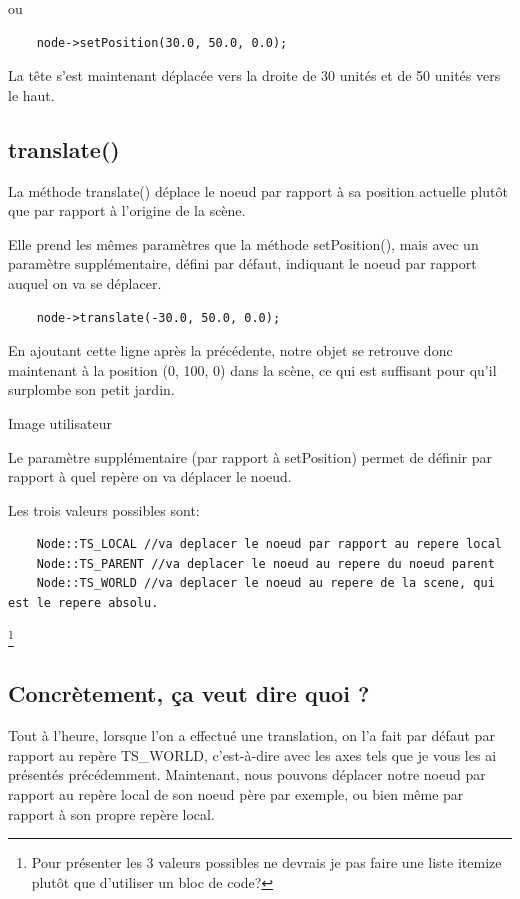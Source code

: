 ou
\begin{lstlisting}
	node->setPosition(30.0, 50.0, 0.0);
\end{lstlisting}

La tête s'est maintenant déplacée vers la droite de 30 unités et de 50 unités vers le haut.




\subsection{translate()}

La méthode translate() déplace le noeud par rapport à sa position actuelle plutôt que par rapport à l'origine de la scène.

Elle prend les mêmes paramètres que la méthode setPosition(), mais avec un paramètre supplémentaire, défini par défaut, indiquant le noeud par rapport auquel on va se déplacer.
\begin{lstlisting}
	node->translate(-30.0, 50.0, 0.0);
\end{lstlisting}

En ajoutant cette ligne après la précédente, notre objet se retrouve donc maintenant à la position (0, 100, 0) dans la scène, ce qui est suffisant pour qu'il surplombe son petit jardin.

Image utilisateur

Le paramètre supplémentaire (par rapport à setPosition) permet de définir par rapport à quel repère on va déplacer le noeud.

Les trois valeurs possibles sont:
\begin{lstlisting}
    Node::TS_LOCAL //va deplacer le noeud par rapport au repere local
    Node::TS_PARENT //va deplacer le noeud au repere du noeud parent
    Node::TS_WORLD //va deplacer le noeud au repere de la scene, qui est le repere absolu.
\end{lstlisting}\footnote{Pour présenter les 3 valeurs possibles ne devrais je pas faire une liste itemize plutôt que d'utiliser un bloc de code?}



\subsection{Concrètement, \c{c}a veut dire quoi ?}

Tout à l'heure, lorsque l'on a effectué une translation, on l'a fait par défaut par rapport au repère TS\_WORLD, c'est-à-dire avec les axes tels que je vous les ai présentés précédemment. Maintenant, nous pouvons déplacer notre noeud par rapport au repère local de son noeud père par exemple, ou bien même par rapport à son propre repère local.

